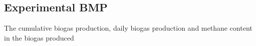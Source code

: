 \subsection{Experimental BMP}
The cumulative biogas production, daily biogas production and methane content in the biogas produced